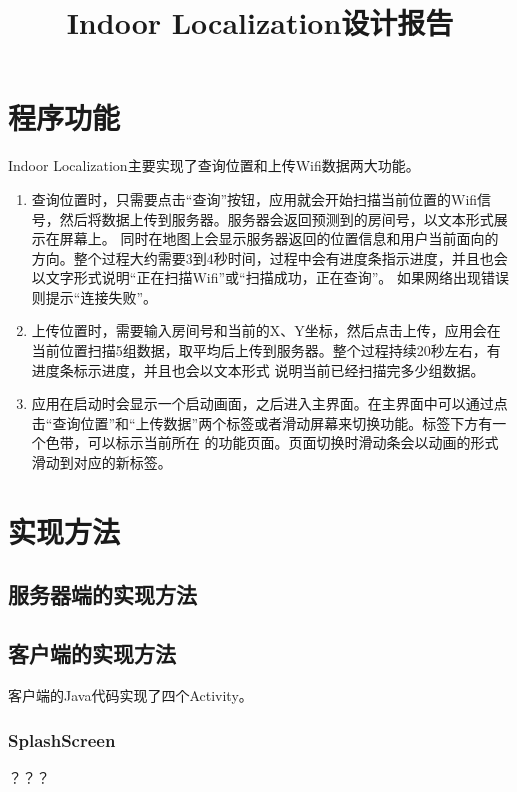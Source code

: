 \documentclass[a4paper,10pt]{article}
\begin{document}
\begin{CJK*}{UTF8}{gbsn}
\CJKtilde
\title{Indoor Localization设计报告}
\author{}
\date{}
\maketitle

\section{程序功能}
Indoor Localization主要实现了查询位置和上传Wifi数据两大功能。
\begin{enumerate}
 \item 查询位置时，只需要点击``查询''按钮，应用就会开始扫描当前位置的Wifi信号，然后将数据上传到服务器。服务器会返回预测到的房间号，以文本形式展示在屏幕上。
 同时在地图上会显示服务器返回的位置信息和用户当前面向的方向。整个过程大约需要3到4秒时间，过程中会有进度条指示进度，并且也会以文字形式说明``正在扫描Wifi''或``扫描成功，正在查询''。
 如果网络出现错误则提示``连接失败''。
 \item 上传位置时，需要输入房间号和当前的X、Y坐标，然后点击上传，应用会在当前位置扫描5组数据，取平均后上传到服务器。整个过程持续20秒左右，有进度条标示进度，并且也会以文本形式
 说明当前已经扫描完多少组数据。
 \item 应用在启动时会显示一个启动画面，之后进入主界面。在主界面中可以通过点击``查询位置''和``上传数据''两个标签或者滑动屏幕来切换功能。标签下方有一个色带，可以标示当前所在
 的功能页面。页面切换时滑动条会以动画的形式滑动到对应的新标签。
\end{enumerate}

\section{实现方法}
  \subsection{服务器端的实现方法}
  \subsection{客户端的实现方法}
  客户端的Java代码实现了四个Activity。
    \subsubsection{SplashScreen}
    ？？？

\end{CJK*}
\end{document}
